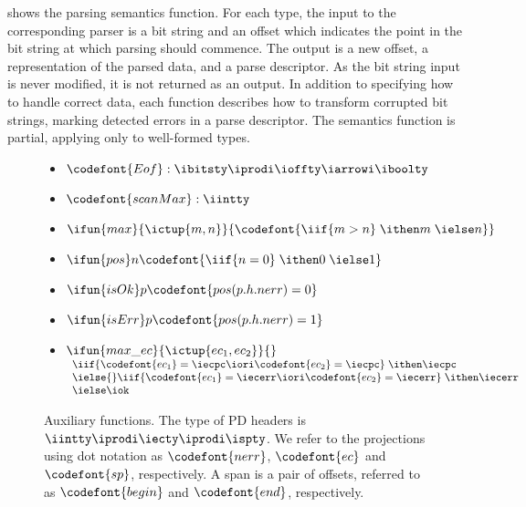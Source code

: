  shows the parsing semantics function.  For each
type, the input to the corresponding parser is a bit string and an
offset which indicates the point in the bit string at which parsing
should commence.  The output is a new offset, a representation of the
parsed data, and a parse descriptor. As the bit string input is
never modified, it is not returned as an output.  In addition
to specifying how to handle correct data, each function describes how
to transform corrupted bit strings, marking detected errors in
a parse descriptor. The semantics function is partial, applying only
to well-formed \ddc{} types.

\begin{figure}
\begin{itemize}
\newcommand{\labelitemi}{}
\item $\codefont {Eof} : \ibitsty \iprodi \ioffty \iarrowi \iboolty$

\item $\codefont{scanMax} : \iintty$

\item $\ifun {max} {\ictup{m,n}} {\codefont{\iif {m>n}\; \ithen m\; \ielse n}}$
\item $\ifun {pos} n {\codefont{\iif {n=0}\; \ithen 0\; \ielse 1}}$
\item $\ifun {isOk} p {\codefont{pos(p.h.nerr) = 0}}$
\item $\ifun {isErr} p {\codefont{pos(p.h.nerr) = 1}}$

\item $\ifun {max\_ec} {\ictup{ec_1, ec_2}} {}$ \\
  $\begin{array}{l}
    \iif {\codefont{ec_1} = \iecpc \iori \codefont{ec_2} = \iecpc}\; \ithen \iecpc \\
    \ielse{} \iif {\codefont{ec_1} = \iecerr \iori \codefont{ec_2} = \iecerr}\; \ithen \iecerr \\
    \ielse \iok
   \end{array}$
\end{itemize}
\caption{Auxiliary functions.  The type of PD headers is $\iintty
  \iprodi \iecty \iprodi \ispty$.  We refer to the projections using
  dot notation as $\codefont{nerr}$, $\codefont{ec}$ and
  $\codefont{sp}$, respectively. A span is a pair of offsets, referred
  to as $\codefont{begin}$ and $\codefont{end}$, respectively.}
\label{fig:aux-funs}
\end{figure}

